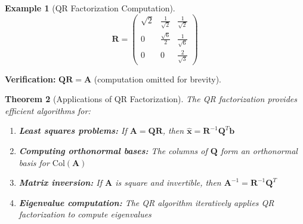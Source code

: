 \documentclass[12pt]{article}
\numberwithin{equation}{section}
\newcommand{\vect}[1]{\boldsymbol{#1}}   %
\newcommand{\mat}[1]{\mathbf{#1}}        %
\theoremstyle{plain}
\newtheorem{theorem}{Theorem}[section]
\theoremstyle{definition}
\newtheorem{example}[theorem]{Example}
\theoremstyle{remark}
\begin{document}
\begin{example}[QR Factorization Computation]
$$\mat{R} = \begin{pmatrix} \sqrt{2} & \frac{1}{\sqrt{2}} & \frac{1}{\sqrt{2}} \\ 0 & \frac{\sqrt{6}}{2} & \frac{1}{\sqrt{6}} \\ 0 & 0 & \frac{2}{\sqrt{3}} \end{pmatrix}$$

\textbf{Verification:} $\mat{Q}\mat{R} = \mat{A}$ (computation omitted for brevity).
\end{example}

\begin{theorem}[Applications of QR Factorization]
The QR factorization provides efficient algorithms for:
\begin{enumerate}
\item \textbf{Least squares problems:} If $\mat{A} = \mat{Q}\mat{R}$, then $\hat{\vect{x}} = \mat{R}^{-1}\mat{Q}^T\vect{b}$
\item \textbf{Computing orthonormal bases:} The columns of $\mat{Q}$ form an orthonormal basis for $\text{Col}(\mat{A})$
\item \textbf{Matrix inversion:} If $\mat{A}$ is square and invertible, then $\mat{A}^{-1} = \mat{R}^{-1}\mat{Q}^T$
\item \textbf{Eigenvalue computation:} The QR algorithm iteratively applies QR factorization to compute eigenvalues
\end{enumerate}
\end{theorem}
\end{document}
